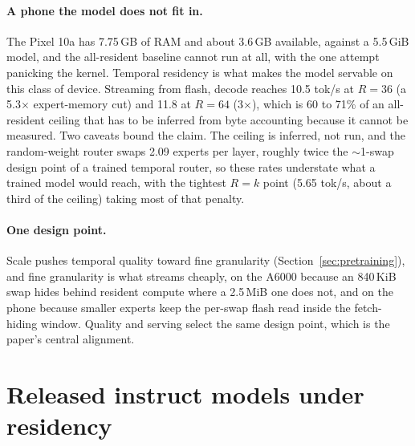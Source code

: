 \documentclass{article}
\begin{document}
\paragraph{A phone the model does not fit in.} The Pixel 10a has 7.75\,GB of RAM and about
3.6\,GB available, against a 5.5\,GiB model, and the all-resident baseline cannot run at
all, with the one attempt panicking the kernel. Temporal residency is what makes the model
servable on this class of device. Streaming from flash, decode reaches 10.5 tok/s at $R=36$
(a 5.3$\times$ expert-memory cut) and 11.8 at $R=64$ (3$\times$), which is 60 to 71\% of an
all-resident ceiling that has to be inferred from byte accounting because it cannot be
measured. Two caveats bound the claim. The ceiling is inferred, not run, and the
random-weight router swaps 2.09 experts per layer, roughly twice the $\sim$1-swap design
point of a trained temporal router, so these rates understate what a trained model would
reach, with the tightest $R=k$ point (5.65 tok/s, about a third of the ceiling) taking most
of that penalty.

\paragraph{One design point.} Scale pushes temporal quality toward fine granularity
(Section~\ref{sec:pretraining}), and fine granularity is what streams cheaply, on the A6000
because an 840\,KiB swap hides behind resident compute where a 2.5\,MiB one does not, and on
the phone because smaller experts keep the per-swap flash read inside the fetch-hiding
window. Quality and serving select the same design point, which is the paper's central
alignment.

\section{Released instruct models under residency}\label{sec:instruct}
\end{document}

